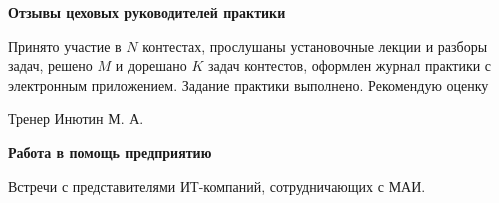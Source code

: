 \begin{center}
\bfseries{\large Отзывы цеховых руководителей практики}
\end{center}

Принято участие в $N$ контестах, прослушаны установочные лекции и разборы задач, решено $M$ и дорешано $K$ задач контестов, оформлен журнал практики с электронным приложением. Задание практики выполнено. Рекомендую оценку

\vspace{15pt}

\hfill Тренер Инютин М. А. 

\vspace{200pt}

\begin{center}
\bfseries{\large Работа в помощь предприятию}
\end{center}

Встречи с представителями ИТ-компаний, сотрудничающих с МАИ.

\pagebreak
